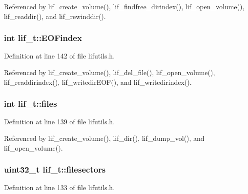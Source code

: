 Referenced by lif\+\_\+create\+\_\+volume(), lif\+\_\+findfree\+\_\+dirindex(), lif\+\_\+open\+\_\+volume(), lif\+\_\+readdir(), and lif\+\_\+rewinddir().

\subsubsection[{\texorpdfstring{E\+O\+Findex}{EOFindex}}]{\setlength{\rightskip}{0pt plus 5cm}int lif\+\_\+t\+::\+E\+O\+Findex}\hypertarget{structlif__t_a68c465a879c7d4bd2279682185b6250e}{}\label{structlif__t_a68c465a879c7d4bd2279682185b6250e}


Definition at line 142 of file lifutils.\+h.



Referenced by lif\+\_\+create\+\_\+volume(), lif\+\_\+del\+\_\+file(), lif\+\_\+open\+\_\+volume(), lif\+\_\+readdirindex(), lif\+\_\+writedir\+E\+O\+F(), and lif\+\_\+writedirindex().

\subsubsection[{\texorpdfstring{files}{files}}]{\setlength{\rightskip}{0pt plus 5cm}int lif\+\_\+t\+::files}\hypertarget{structlif__t_aceca398e2e3f6bcffe1593969544d546}{}\label{structlif__t_aceca398e2e3f6bcffe1593969544d546}


Definition at line 139 of file lifutils.\+h.



Referenced by lif\+\_\+create\+\_\+volume(), lif\+\_\+dir(), lif\+\_\+dump\+\_\+vol(), and lif\+\_\+open\+\_\+volume().

\subsubsection[{\texorpdfstring{filesectors}{filesectors}}]{\setlength{\rightskip}{0pt plus 5cm}uint32\+\_\+t lif\+\_\+t\+::filesectors}\hypertarget{structlif__t_a1223702cce63f879654d51773243643d}{}\label{structlif__t_a1223702cce63f879654d51773243643d}


Definition at line 133 of file lifutils.\+h.



